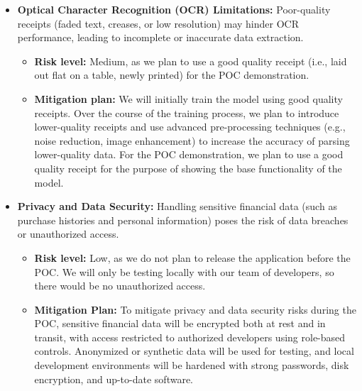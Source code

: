 \documentclass{article}
\begin{document}
\begin{itemize}
    \item \textbf{Optical Character Recognition (OCR) Limitations:} Poor-quality
    receipts (faded text, creases, or low resolution) may hinder OCR
    performance, leading to incomplete or inaccurate data extraction.
     \begin{itemize}
         \item \textbf{Risk level:} Medium, as we plan to use a good quality
         receipt (i.e., laid out flat on a table, newly printed) for the POC
         demonstration.
        \item \textbf{Mitigation plan:} We will initially train the model using
        good quality receipts. Over the course of the training process, we plan
        to introduce lower-quality receipts and use advanced pre-processing
        techniques (e.g., noise reduction, image enhancement) to increase the
        accuracy of parsing lower-quality data. For the POC demonstration, we
        plan to use a good quality receipt for the purpose of showing the base
        functionality of the model.
      \end{itemize}

    \item \textbf{Privacy and Data Security:} Handling sensitive financial data
    (such as purchase histories and personal information) poses the risk of data
    breaches or unauthorized access.
    \begin{itemize}
        \item \textbf{Risk level:} Low, as we do not plan to release the
        application before the POC. We will only be testing locally with our
        team of developers, so there would be no unauthorized access.
         \item \textbf{Mitigation Plan:} To mitigate privacy and data security
         risks during the POC, sensitive financial data will be encrypted both
         at rest and in transit, with access restricted to authorized developers
         using role-based controls. Anonymized or synthetic data will be used
         for testing, and local development environments will be hardened with
         strong passwords, disk encryption, and up-to-date software. 
    \end{itemize}


\end{itemize}
\end{document}
